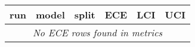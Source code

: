 \begin{tabular}{llllrr}
\toprule
run & model & split & ECE & LCI & UCI\\
\midrule
\multicolumn{6}{c}{\emph{No ECE rows found in metrics}}\\
\bottomrule
\end{tabular}
